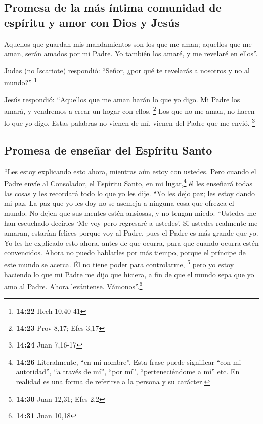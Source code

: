 \hypertarget{promesa-de-la-muxe1s-uxedntima-comunidad-de-espuxedritu-y-amor-con-dios-y-jesuxfas}{%
\subsection{Promesa de la más íntima comunidad de espíritu y amor con
Dios y
Jesús}\label{promesa-de-la-muxe1s-uxedntima-comunidad-de-espuxedritu-y-amor-con-dios-y-jesuxfas}}

 Aquellos que guardan mis mandamientos son los que me
aman; aquellos que me aman, serán amados por mi Padre. Yo también los
amaré, y me revelaré en ellos''.

 Judas (no Iscariote) respondió: ``Señor, ¿por qué te
revelarás a nosotros y no al mundo?'' \footnote{\textbf{14:22} Hech
  10,40-41}

 Jesús respondió: ``Aquellos que me aman harán lo que yo
digo. Mi Padre los amará, y vendremos a crear un hogar con ellos.
\footnote{\textbf{14:23} Prov 8,17; Efes 3,17}  Los que
no me aman, no hacen lo que yo digo. Estas palabras no vienen de mí,
vienen del Padre que me envió. \footnote{\textbf{14:24} Juan 7,16-17}

\hypertarget{promesa-de-enseuxf1ar-del-espuxedritu-santo}{%
\subsection{Promesa de enseñar del Espíritu
Santo}\label{promesa-de-enseuxf1ar-del-espuxedritu-santo}}

 ``Les estoy explicando esto ahora, mientras aún estoy
con ustedes.  Pero cuando el Padre envíe al Consolador,
el Espíritu Santo, en mi lugar,\footnote{\textbf{14:26} Literalmente,
  ``en mi nombre''. Esta frase puede significar ``con mi autoridad'',
  ``a través de mí'', ``por mí'', ``perteneciéndome a mí'' etc. En
  realidad es una forma de referirse a la persona y su carácter.} él les
enseñará todas las cosas y les recordará todo lo que yo les dije.
 ``Yo les dejo paz; les estoy dando mi paz. La paz que yo
les doy no se asemeja a ninguna cosa que ofrezca el mundo. No dejen que
sus mentes estén ansiosas, y no tengan miedo.  ``Ustedes
me han escuchado decirles `Me voy pero regresaré a ustedes'. Si ustedes
realmente me amaran, estarían felices porque voy al Padre, pues el Padre
es más grande que yo.  Yo les he explicado esto ahora,
antes de que ocurra, para que cuando ocurra estén convencidos.
 Ahora no puedo hablarles por más tiempo, porque el
príncipe de este mundo se acerca. Él no tiene poder para controlarme,
\footnote{\textbf{14:30} Juan 12,31; Efes 2,2}  pero yo
estoy haciendo lo que mi Padre me dijo que hiciera, a fin de que el
mundo sepa que yo amo al Padre. Ahora levántense. Vámonos''.\footnote{\textbf{14:31}
  Juan 10,18}

